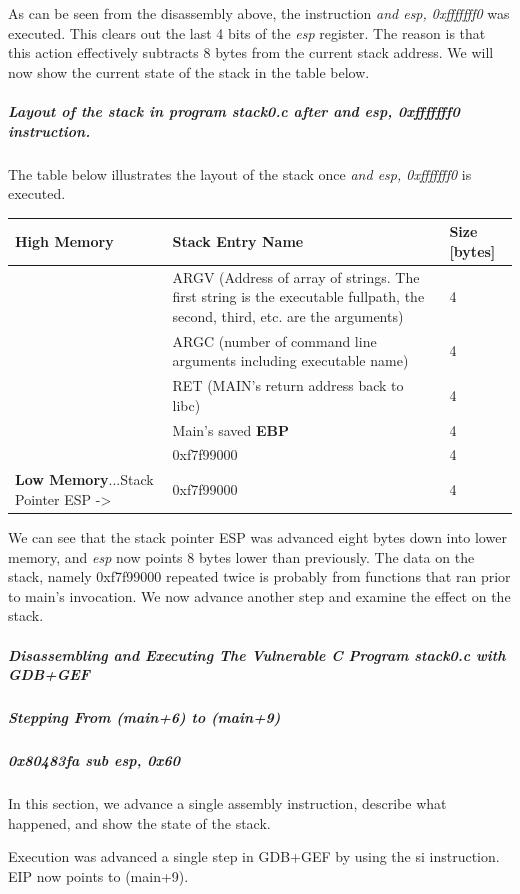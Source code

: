 As can be seen from the disassembly above, the instruction \textit{and esp, 0xfffffff0} was executed. This clears out the last 4 bits of the \textit{esp} register. The reason is that this action effectively subtracts 8 bytes from the current stack address. We will now show the current state of the stack in the table below.

\subparagraph{Layout of the stack in program \textit{stack0.c} after \textit{and esp, 0xfffffff0} instruction.}

The table below illustrates the layout of the stack once \textit{and esp, 0xfffffff0} is executed.

\bigskip\noindent
\begin{tabular}{p{}p{}p{}}
\toprule
High Memory & Stack Entry Name & Size [bytes] \\
\hline
 & ARGV (Address of array of strings.  The first string is the executable fullpath, the second, third, etc. are the arguments) & 4 \\
 & ARGC (number of command line arguments including executable name) & 4 \\
 & RET (MAIN's return address back to libc) & 4 \\
 & Main's saved \textbf{EBP} & 4 \\
 & 0xf7f99000 & 4 \\
\textbf{Low Memory}...Stack Pointer ESP -\textgreater  & 0xf7f99000 & 4 \\
\bottomrule
\end{tabular}

\bigskip

We can see that the stack pointer ESP was advanced eight bytes down into lower memory, and \textit{esp} now points 8 bytes lower than previously. The data on the stack, namely 0xf7f99000 repeated twice is probably from functions that ran prior to main's invocation. We now advance another step and examine the effect on the stack.

\subparagraph{Disassembling and Executing The Vulnerable C Program \textit{stack0.c} with GDB+GEF}

\subparagraph{Stepping From (main+6) to (main+9)}

\subparagraph{0x80483fa \textbf{sub esp, 0x60}}

In this section, we advance a single assembly instruction, describe what happened, and show the state of the stack.

Execution was advanced a single step in GDB+GEF by using the si instruction. EIP now points to (main+9).

